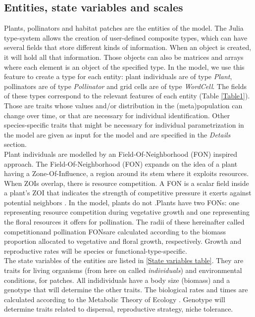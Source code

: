 \documentclass[11pt, a4paper]{article}
\begin{document}
\subsection{Entities, state variables and scales}
Plants, pollinators and habitat patches are the entities of the model. The Julia type-system allows the creation of user-defined composite types, which can have several fields that store different kinds of information. When an object is created, it will hold all that information. Those objects can also be matrices and arrays where each element is an object of the specified type. In the model, we use this feature to create a type for each entity: plant individuals are of type \textit{Plant}, pollinators are of type \textit{Pollinator} and grid cells are of type \textit{WordCell}.  The fields of these types correspond to the relevant features of each entity (Table \ref{Table1}). Those are traits whose values and/or distribution in the (meta)population can change over time, or that are necessary for individual identification. Other species-specific traits that might be necessary for individual parametrization in the model are given as input for the model and are specified in the \textit{Details} section. \\
Plant individuals are modelled by an Field-Of-Neighborhood (FON) inspired approach. The Field-Of-Neighborhood (FON) expands on the idea of a plant having a Zone-Of-Influence, a region around its stem where it exploits resources. When ZOIs overlap, there is resource competition.  A FON is a scalar field inside a plant's ZOI that indicates the strength of competitive pressure it exerts against potential neighbors \cite{IBMbook, BergerHildebrandt2000}. In the model, plants do not  .Plants have two FONs: one representing resource competition during vegetative growth and one representing the floral resources it offers for pollination. The radii of these hereinafter called \textquotesingle competition\textquotesingle and \textquotesingle pollination FONs\textquotesingle are calculated according to the biomass proportion allocated to vegetative and floral growth, respectively. Growth and reproductive rates will be species or functional-type-specific.\\
The state variables of the entities are listed in \ref{State variables table}. They are traits for living organisms (from here on called \textit{individuals}) and environmental conditions, for patches. All indidividuals have a body size (biomass) and a genotype that will determine the other traits. The biological rates and times are calculated according to the Metabolic Theory of Ecology \cite{Brown_MTE_2004}. Genotype will determine traits related to dispersal, reproductive strategy, niche tolerance. %
\end{document}
